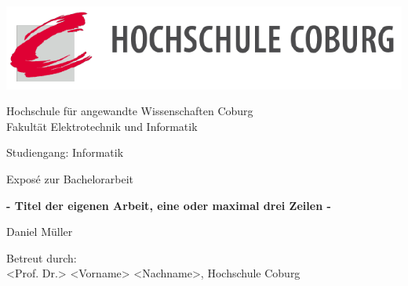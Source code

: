 \begin{titlepage}
    \begin{center}
    \includegraphics[width=\textwidth]{Images/logo}
        \begin{Large}
        Hochschule für angewandte Wissenschaften Coburg
        \\
        Fakultät Elektrotechnik und Informatik
        \par
        \end{Large}
        \vspace{2.0cm}
        
        \begin{Large}
            Studiengang: Informatik
            \par
        \end{Large}
        \vspace{1.5cm}
        
        \begin{Large}
            Exposé zur Bachelorarbeit
        \end{Large}
        \vspace{2.0cm}

        \begin{huge}
            \textbf{- Titel der eigenen Arbeit, eine oder maximal drei Zeilen -} 
            \par
        \end{huge}        
        \vfill
        
        \begin{huge}
            Daniel Müller
        \end{huge}
        \vspace{2.0cm}
        
        \begin{large}
            
            Betreut durch:
            \\
            <Prof. Dr.> <Vorname> <Nachname>, Hochschule Coburg
            \\
            \par
        \end{large}
        
    \end{center}
\end{titlepage}
\restoregeometry